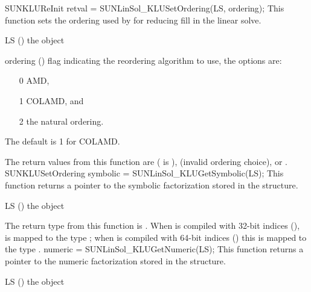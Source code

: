 {SUNKLUReInit}
%
%
{
  retval = SUNLinSol\_KLUSetOrdering(LS, ordering);
}
{
  This function sets the ordering used by {\klu} for reducing fill in
  the linear solve.
}
{
  \begin{args}[ordering]
  \item[LS] ()
    the {\sunlinsolklu} object
  \item[ordering] ()
    flag indicating the reordering algorithm to use, the options are:
    \begin{itemize}
    \item[0] AMD,
    \item[1] COLAMD, and
    \item[2] the natural ordering.
    \end{itemize}
    The default is 1 for COLAMD.
  \end{args}
}
{
  The return values from this function are 
  ( is ), \newline
   (invalid ordering choice), or .
}
{}
{SUNKLUSetOrdering}
%
%
{
  symbolic = SUNLinSol\_KLUGetSymbolic(LS);
}
{
  This function returns a pointer to the {\klu} symbolic factorization
  stored in the {\sunlinsolklu}  structure.
}
{
  \begin{args}[LS]
  \item[LS] ()
    the {\sunlinsolklu} object
  \end{args}
}
{
  The return type from this function is .
}
{
  When {\sundials} is compiled with 32-bit indices
  (),\\
   is mapped to the {\klu} type
  ; when {\sundials} is compiled with 64-bit indices
  () this is mapped to the {\klu}
  type .
}
%
%
{
  numeric = SUNLinSol\_KLUGetNumeric(LS);
}
{
  This function returns a pointer to the {\klu} numeric factorization
  stored in the {\sunlinsolklu}  structure.
}
{
  \begin{args}[LS]
  \item[LS] ()
    the {\sunlinsolklu} object
  \end{args}
}

